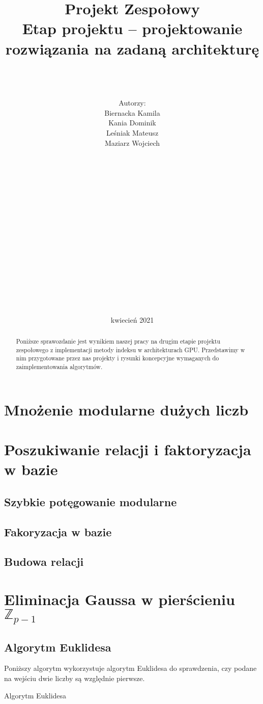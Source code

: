 \documentclass[]{article}
\title{Projekt Zespołowy \\
	\Huge Etap projektu – projektowanie rozwiązania na zadaną architekturę}
\author{\\ \\ \\ Autorzy:
	\\Biernacka Kamila\\ 
	Kania Dominik\\ 
	Leśniak Mateusz\\ 
	Maziarz Wojciech\\ \\ \\ \\ \\ \\ \\ \\ \\ \\ \\ \\ \\ \\ \\ \\ \\  }
\date{kwiecień 2021}
\begin{document}
\maketitle
\newpage



\begin{abstract}

Poniższe sprawozdanie jest wynikiem naszej pracy na drugim etapie projektu zespołowego z implementacji metody indeksu w architekturach GPU. Przedstawimy w nim przygotowane przez nas projekty i rysunki koncepcyjne wymaganych do zaimplementowania algorytmów.

\tableofcontents
\newpage

\end{abstract}

\section{Mnożenie modularne dużych liczb}
	
\section{Poszukiwanie relacji i faktoryzacja w bazie}
	\subsection{Szybkie potęgowanie modularne}
	
	\subsection{Fakoryzacja w bazie}
	
	\subsection{Budowa relacji}

\section{Eliminacja Gaussa w pierścieniu \(\mathbb{Z}_{p-1}\)}
	\subsection{Algorytm Euklidesa}
		Poniższy algorytm wykorzystuje algorytm Euklidesa do sprawdzenia, czy podane na wejściu dwie liczby są względnie pierwsze. \\
	\begin{algorithm}[H]

		\caption{Algorytm Euklidesa}
		\BlankLine
		
	\end{algorithm}
\end{document}
